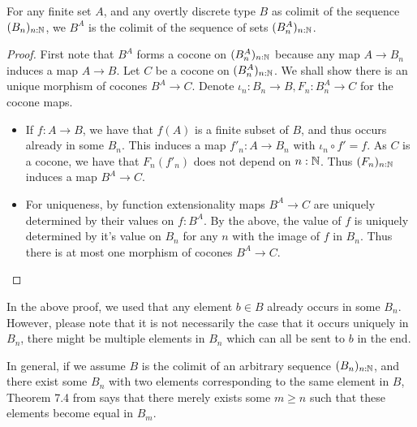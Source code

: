 \begin{lemma}\label{colimitCompact}
  For any finite set $A$, 
  and any overtly discrete type $B$ as colimit of the sequence $(B_n)_{n:\mathbb{N}}$, 
  we $B^A$ is the colimit of the sequence of sets $(B_n^A)_{n:\mathbb{N}}$. 
\end{lemma}  
\begin{proof}
  First note that $B^A$ forms a cocone on $(B_n^A)_{n:\mathbb{N}}$ 
  because any map $A \to B_n$ induces a map $A \to B$. 
  Let $C$ be a cocone on $(B_n^A)_{n:\mathbb{N}}$. 
  We shall show there is an unique morphism of cocones $B^A \to C$. 
  Denote $\iota_n:B_n \to B, F_n:B_n^A\to C$ for the cocone maps. 
  \begin{itemize}
    \item 
      If $f:A\to B$, we have that $f(A)$ is a finite subset of $B$, and thus occurs already in some $B_n$. 
      This induces a map $f'_n:A\to B_n$ with $\iota_n\circ f' = f$. 
      As $C$ is a cocone, we have that $F_n(f'_n)$ does not depend on $n:\mathbb{N}$. 
      Thus $(F_n)_{n:\mathbb{N}}$ induces a map $B^A\to C$. 
    \item 
      For uniqueness, by function extensionality maps $B^A \to C$ are uniquely determined by their values on 
      $f:B^A$. By the above, the value of $f$ is uniquely determined by it's value on $B_n$ for 
      any $n$ with the image of $f$ in $B_n$. Thus there is at most one morphism of cocones $B^A \to C$. 
  \end{itemize}
\end{proof}
\begin{remark}\label{rmkEqualityColimit}
  In the above proof, we used that any element $b\in B$ already occurs in some $B_n$. 
  However, please note that it is not necessarily the case that it occurs uniquely in $B_n$, 
  there might be multiple elements in $B_n$ which can all be sent to $b$ in the end. 

  In general, if we assume $B$ is the colimit of an arbitrary sequence $(B_n)_{n:\mathbb{N}}$, 
  and there exist some $B_n$ with two elements corresponding to the same element in $B$, 
  Theorem 7.4 from \cite{SequentialColimitHoTT} says that there merely exists some $m\geq n$
  such that these elements become equal in $B_m$. 
\end{remark}
